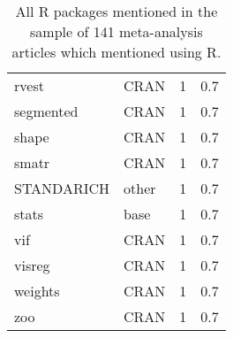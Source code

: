 \begin{table}[ht]
\begin{tabular}{llrr}
  rvest & CRAN & 1 & 0.7 \\ 
  segmented & CRAN & 1 & 0.7 \\ 
  shape & CRAN & 1 & 0.7 \\ 
  smatr & CRAN & 1 & 0.7 \\ 
  STANDARICH & other & 1 & 0.7 \\ 
  stats & base & 1 & 0.7 \\ 
  vif & CRAN & 1 & 0.7 \\ 
  visreg & CRAN & 1 & 0.7 \\ 
  weights & CRAN & 1 & 0.7 \\ 
  zoo & CRAN & 1 & 0.7 \\ 
   \hline
\end{tabular}
\caption{All R packages mentioned in the sample of 141 meta-analysis articles which mentioned using R.} 
\label{tab:app_ma_res_all_rpkg_mentions}
\end{table}
